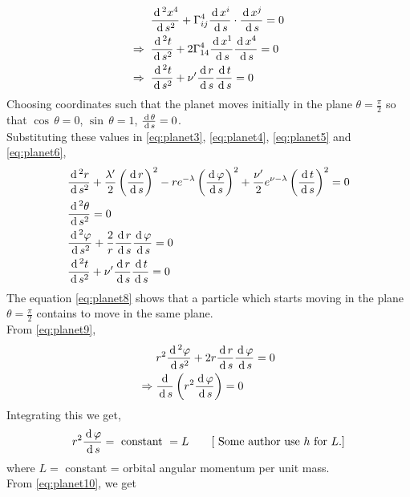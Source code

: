 \documentclass[../main-sheet.tex]{subfiles}
\begin{document}
\begin{soln}
        \begin{align}
            &\frac{\,\mathrm{d}\,^2 x^4}{\,\mathrm{d}\, s^2}+\Gamma_{ij}^4 \frac{\,\mathrm{d}\, x^i}{\,\mathrm{d}\, s}\cdot \frac{\,\mathrm{d}\, x^j}{\,\mathrm{d}\, s}=0\notag\\
            \Rightarrow\;\; & \frac{\,\mathrm{d}\,^2 t}{\,\mathrm{d}\, s^2}+2\Gamma_{14}^4\frac{\,\mathrm{d}\, x^1}{\,\mathrm{d}\, s}\frac{\,\mathrm{d}\, x^4}{\,\mathrm{d}\, s}=0\notag\\
            \Rightarrow\;\; & \frac{\,\mathrm{d}\,^2 t}{\,\mathrm{d}\, s^2}+\nu' \frac{\,\mathrm{d}\, r}{\,\mathrm{d}\, s}\frac{\,\mathrm{d}\, t}{\,\mathrm{d}\, s}=0
            \label{eq:planet6}
        \end{align}
        Choosing coordinates such that the planet moves initially in the plane \(\theta=\frac{\pi}{2}\) so that \(\cos\,\theta=0\), \(\sin\,\theta=1\), \(\frac{\,\mathrm{d}\, \theta}{\,\mathrm{d}\, s}=0\).\\
        Substituting these values in \eqref{eq:planet3}, \eqref{eq:planet4}, \eqref{eq:planet5} and \eqref{eq:planet6},
        \begin{align}
            & \frac{\,\mathrm{d}\,^2 r}{\,\mathrm{d}\, s^2}+\frac{\lambda '}{2}\left( \frac{\,\mathrm{d}\, r}{\,\mathrm{d}\, s} \right)^2-r e^{-\lambda}\left( \frac{\,\mathrm{d}\, \varphi}{\,\mathrm{d}\, s} \right)^2+\frac{\nu '}{2}e^{\nu-\lambda}\left( \frac{\,\mathrm{d}\, t}{\,\mathrm{d}\, s} \right)^2=0\label{eq:planet7}\\
            & \frac{\,\mathrm{d}\,^2 \theta}{\,\mathrm{d}\, s^2}=0\label{eq:planet8}\\
            & \frac{\,\mathrm{d}\,^2 \varphi}{\,\mathrm{d}\, s^2}+\frac{2}{r}\frac{\,\mathrm{d}\, r}{\,\mathrm{d}\, s}\frac{\,\mathrm{d}\, \varphi}{\,\mathrm{d}\, s}=0\label{eq:planet9}\\
            & \frac{\,\mathrm{d}\,^2 t}{\,\mathrm{d}\, s^2}+\nu' \frac{\,\mathrm{d}\, r}{\,\mathrm{d}\, s}\frac{\,\mathrm{d}\, t}{\,\mathrm{d}\, s}=0\label{eq:planet10}
        \end{align}
        The equation \eqref{eq:planet8} shows that a particle which starts moving in the plane \(\theta=\frac{\pi}{2}\) contains to move in the same plane.\\
        From \eqref{eq:planet9},
        \begin{align*}
            &r^2\frac{\,\mathrm{d}\,^{2} \varphi}{\,\mathrm{d}\, s^{2}}+2r\frac{\,\mathrm{d}\, r}{\,\mathrm{d}\, s}\frac{\,\mathrm{d}\, \varphi}{\,\mathrm{d}\, s}=0\\
            \Rightarrow\;&\frac{\,\mathrm{d}\, }{\,\mathrm{d}\, s}\left( r^2\frac{\,\mathrm{d}\, \varphi}{\,\mathrm{d}\, s} \right)=0
        \end{align*}
        Integrating this we get,
        \begin{equation}
            r^2\frac{\,\mathrm{d}\, \varphi}{\,\mathrm{d}\, s}=\text{ constant }=L\qquad[\text{ Some author use \(h\) for }L.]
            \label{eq:planet11}
        \end{equation}
        where \(L= \) constant = orbital angular momentum per unit mass.\\
        From \eqref{eq:planet10}, we get

\end{soln}
\end{document}
